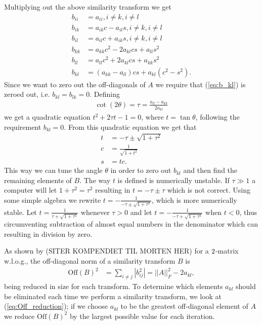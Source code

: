 \documentclass[twocolumn]{aastex62}
\begin{document}
Multiplying out the above similarity transform we get 
\begin{align}
	b_{ii} &= a_{ii} , i\neq k, i\neq l\\
	b_{ik} &= a_{ik}c - a_{il}s, i\neq k, i\neq l\\
	b_{il} &= a_{il}c + a_{ik}s, i\neq k, i\neq l\\
	b_{kk} &= a_{kk}c^2 - 2a_{kl}cs + a_{ll}s^2\\
	b_{ll} &= a_{ll}c^2 + 2a_{kl}cs + a_{kk}s^2\\
	b_{kl} &= (a_{kk} - a_{ll})cs + a_{kl}(c^2 - s^2).
	\label{eq:b_kl}
\end{align}
Since we want to zero out the off-diagonals of $A$ we require that (\ref{eq:b_kl}) is zeroed out, i.e. $b_{kl} = b_{lk} = 0$. Defining 
\begin{align}
	\cot(2\theta) = \tau = \frac{a_{ll} - a_{kk}}{2a_{kl}}
\end{align}
we get a quadratic equation $t^2 + 2\tau t - 1 = 0$, where $t = \tan \theta$, following the requirement $b_{kl} = 0$. From this quadratic equation we get that 
\begin{align}
	t &= -\tau \pm \sqrt{1+\tau^2}\\
	c & = \frac{1}{\sqrt{1+t^2}}\\
	s &= tc.
\end{align}
This way we can tune the angle $\theta$ in order to zero out $b_{kl}$ and then find the remaining elements of $B$.  The way $t$ is defined is numerically unstable. If $\tau\gg1$ a computer will let $1+\tau^2 = \tau^2$ resulting in $t = -\tau \pm \tau$ which is not correct. Using some simple algebra we rewrite $t = -\frac{1}{-\tau \pm \sqrt{1 + \tau^2}}$, which is more numerically stable. Let $t = \frac{1}{\tau + \sqrt{1 + \tau^2}}$ whenever $\tau>0$ and let $t = -\frac{1}{-\tau + \sqrt{1+\tau^2}}$ when $t<0$, thus circumventing  subtraction of almost equal numbers in the denominator which can resulting in division by zero.

As shown by (SITER KOMPENDIET TIL MORTEN HER) for a $2\time 2$-matrix w.l.o.g., the off-diagonal norm of a similarity transform $B$ is 
\begin{align}
\text{Off}(B)^2&= \sum_{i\neq j} |b_{ij}^2| = ||A||_F^2 - 2a_{kl},
\label{eq:Off_reduction}
\end{align}
being reduced in size for each transform. To determine which elements $a_{kl}$ should be eliminated each time we perform a similarity transform, we look at (\ref{eq:Off_reduction}); if we choose $a_{kl}$ to be the greatest off-diagonal element of $A$ we reduce $\text{Off}(B)^2$ by the largest possible value for each iteration. 
\end{document}
